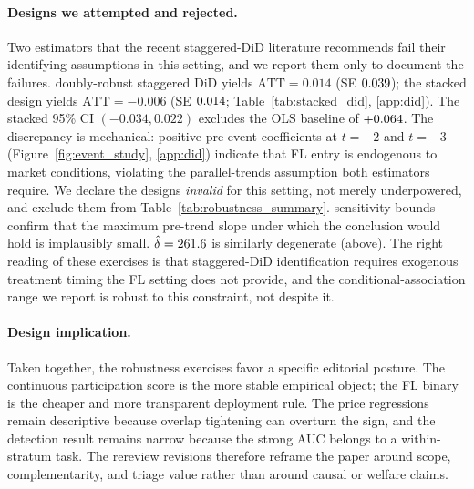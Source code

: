 \paragraph{Designs we attempted and rejected.}
Two estimators that the recent staggered-DiD literature
recommends fail their identifying assumptions in this setting,
and we report them only to document the failures.
\citet{callaway2021difference} doubly-robust staggered DiD
yields $\mathrm{ATT} = 0.014$ (SE $0.039$); the
\citet{cengiz2019effect} stacked design yields
$\mathrm{ATT} = -0.006$ (SE $0.014$;
Table~\ref{tab:stacked_did}, \ref{app:did}). The stacked 95\%
CI $(-0.034, 0.022)$ excludes the OLS baseline of $+0.064$. The
discrepancy is mechanical: positive pre-event coefficients at
$t = -2$ and $t = -3$ (Figure~\ref{fig:event_study},
\ref{app:did}) indicate that FL entry is endogenous to market
conditions, violating the parallel-trends assumption both
estimators require. We declare the designs \emph{invalid} for
this setting, not merely underpowered, and exclude them from
Table~\ref{tab:robustness_summary}. \citet{rambachan2023more}
sensitivity bounds confirm that the maximum pre-trend slope
under which the conclusion would hold is implausibly small.
\citet{oster2019unobservable} $\hat{\delta} = 261.6$ is
similarly degenerate (above). The right reading of these
exercises is that staggered-DiD identification requires
exogenous treatment timing the FL setting does not provide,
and the conditional-association range we report is robust to
this constraint, not despite it.

\paragraph{Design implication.}
Taken together, the robustness exercises favor a specific
editorial posture. The continuous participation score is the
more stable empirical object; the FL binary is the cheaper and
more transparent deployment rule. The price regressions remain
descriptive because overlap tightening can overturn the sign,
and the detection result remains narrow because the strong AUC
belongs to a within-stratum task. The rereview revisions
therefore reframe the paper around scope, complementarity, and
triage value rather than around causal or welfare claims.
